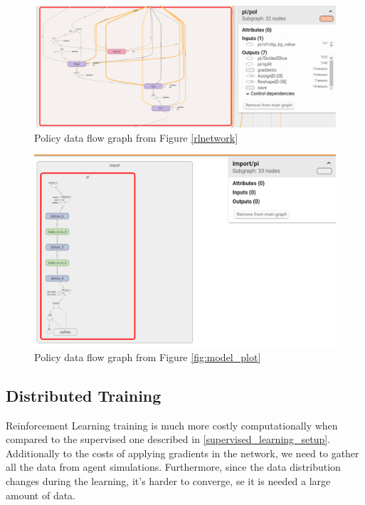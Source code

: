 \begin{figure}[!htbp]
	\centering
	\includegraphics[width=1.1\textwidth]{Cap5/policygraph1.eps}
	\caption{ Policy data flow graph from Figure \ref{rlnetwork}
	}
	\label{fig:policygraph1}
\end{figure}

\begin{figure}[!htbp]
	\centering
	\includegraphics[width=1.1\textwidth]{Cap5/policygraph2.eps}
	\caption{ Policy data flow graph from Figure \ref{fig:model_plot}
	}
	\label{fig:policygraph2}
\end{figure}


\subsection{Distributed Training}\label{sec:distributedtraining}
Reinforcement Learning training is much more costly computationally when compared to the supervised one described in \ref{supervised_learning_setup}. Additionally to the costs of applying gradients in the network, we need to gather all the data from agent simulations. Furthermore, since the data distribution changes during the learning, it's harder to converge, se it is needed a large amount of data.

